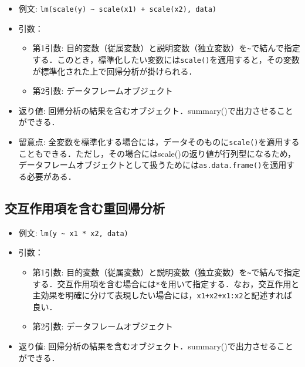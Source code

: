 \documentclass[
  xelatex, ja=standard]{bxjsarticle}
\providecommand{\tightlist}{%
  \setlength{\itemsep}{0pt}\setlength{\parskip}{0pt}}
\begin{document}
\begin{itemize}
\tightlist
\item
  例文:
  \texttt{lm(scale(y)\ \textasciitilde{}\ scale(x1)\ +\ scale(x2),\ data)}
\item
  引数：

  \begin{itemize}
  \tightlist
  \item
    第1引数:
    目的変数（従属変数）と説明変数（独立変数）を\texttt{\textasciitilde{}}で結んで指定する．このとき，標準化したい変数には\texttt{scale()}を適用すると，その変数が標準化された上で回帰分析が掛けられる．
  \item
    第2引数: データフレームオブジェクト
  \end{itemize}
\item
  返り値:
  回帰分析の結果を含むオブジェクト．summary()で出力させることができる．
\item
  留意点:
  全変数を標準化する場合には，データそのものに\texttt{scale()}を適用することもできる．ただし，その場合にはscale()の返り値が行列型になるため，データフレームオブジェクトとして扱うためには\texttt{as.data.frame()}を適用する必要がある．
\end{itemize}

\subsection{交互作用項を含む重回帰分析}\label{ux4ea4ux4e92ux4f5cux7528ux9805ux3092ux542bux3080ux91cdux56deux5e30ux5206ux6790}

\begin{itemize}
\tightlist
\item
  例文: \texttt{lm(y\ \textasciitilde{}\ x1\ *\ x2,\ data)}
\item
  引数：

  \begin{itemize}
  \tightlist
  \item
    第1引数:
    目的変数（従属変数）と説明変数（独立変数）を\texttt{\textasciitilde{}}で結んで指定する．交互作用項を含む場合には\texttt{*}を用いて指定する．なお，交互作用と主効果を明確に分けて表現したい場合には，\texttt{x1+x2+x1:x2}と記述すれば良い．
  \item
    第2引数: データフレームオブジェクト
  \end{itemize}
\item
  返り値:
  回帰分析の結果を含むオブジェクト．summary()で出力させることができる．
\end{itemize}
\end{document}
